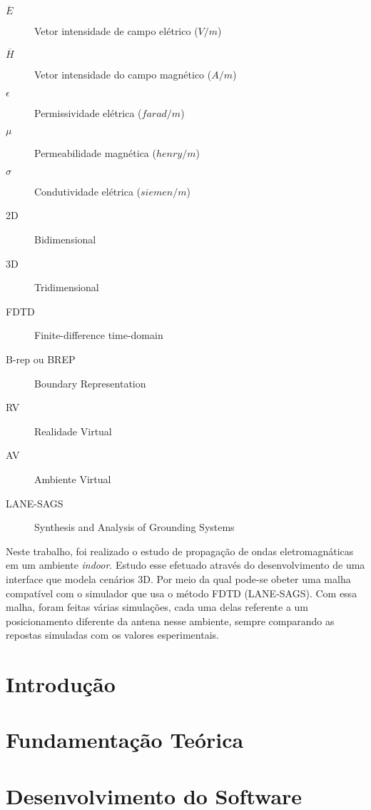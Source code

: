 \documentclass{./public/ufpatccdoisautores}
\begin{document}
\begin{description}
	\item[$\overline{E}$]	Vetor intensidade de campo elétrico ($V/m$)
	\item[$\overline{H}$]	Vetor intensidade do campo magnético ($A/m$)
	\item[$\epsilon$]	Permissividade elétrica ($farad/m$)
	\item[$\mu$]	Permeabilidade magnética ($henry/m$)
	\item[$\sigma$]	Condutividade elétrica ($siemen/m$)
	\item[2D]	Bidimensional 
	\item[3D]	Tridimensional 
	\item[FDTD]	Finite-difference time-domain 
	\item[B-rep ou BREP]	Boundary Representation 
	\item[RV]	Realidade Virtual 
	\item[AV]	Ambiente Virtual 
	\item[LANE-SAGS]	Synthesis and Analysis of Grounding Systems 
\end{description}

\clearpage

\begin{ufpaResumo}
Neste trabalho, foi realizado o estudo de propagação de ondas eletromagnáticas em um ambiente \textit{indoor}. Estudo esse efetuado através do desenvolvimento de uma interface que modela cenários 3D. Por meio da qual pode-se obeter uma malha compatível com o simulador que usa o método FDTD (LANE-SAGS). Com essa malha, foram feitas várias simulações, cada uma delas referente a um posicionamento diferente da antena nesse ambiente, sempre comparando as repostas simuladas com os valores esperimentais.
\end{ufpaResumo}


\chapter{Introdução}


\chapter{Fundamentação Teórica}


\chapter{Desenvolvimento do Software}

\end{document}
